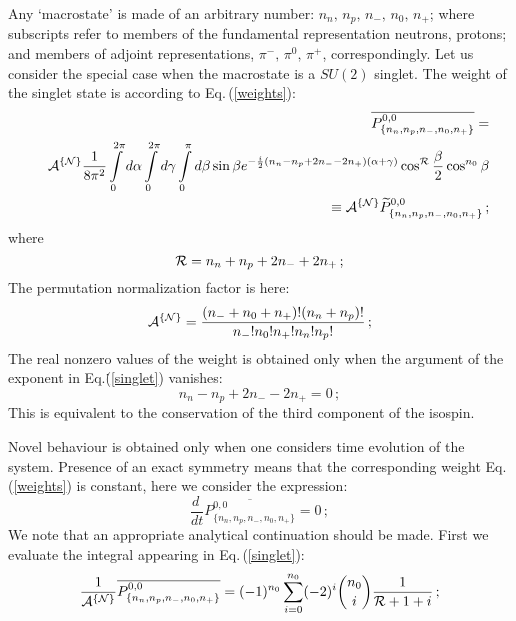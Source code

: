 \documentclass[a4paper,11pt]{article}
\begin{document}
Any  `macrostate' is made of an arbitrary number: $n_n,\, n_p,\,
n_{-},\, n_0, \, n_{+}$; where subscripts refer to members of the
fundamental representation  neutrons, protons; and members of
adjoint representations, $\pi^{-},\, \pi^0,\, \pi^{+}$,
 correspondingly.
Let us consider the special
 case when the macrostate is a $SU(2)$ singlet.
The weight of the singlet state is according to
Eq.\,(\ref{weights}):
\begin{eqnarray} \label{singlet}
& &\overline{P^{0,0}_{\{n_n,n_p,n_{-},n_0,n_{+}\}}}= \nonumber\\
&\ &{\cal A}^{\{{\cal N}\}}{1\over{8\pi^2}}
\int\limits^{2\pi}_0d\alpha\int\limits^{2\pi}_0d\gamma
\int\limits^{\pi}_0d\beta\sin\beta e^{-{i\over
2}(n_n-n_p+2n_{-}-2n_{+})(\alpha+\gamma)} \cos^{\cal R}{\beta\over
2}\cos^{n_0}\beta\nonumber\\ &&\qquad\qquad\qquad\qquad\equiv
{\cal A}^{\{{\cal N}\}}\widetilde
P^{0,0}_{\{n_n,n_p,n_{-},n_0,n_{+}\}}\,;
\end{eqnarray}
where
\begin{equation}\label{defR}
{\cal R}=n_n+n_p+2n_{-}+2n_{+}\,;
\end{equation}
The permutation normalization factor is here:
\begin{equation}\label{pifactor}
{\cal A}^{\{{\cal N}\}} =
\frac{(n_{-}+n_0+n_{+})!(n_n+n_p)!}{n_{-}!n_0!n_{+}!n_n!n_p!}\,;
\end{equation}
The real nonzero values of the weight is obtained only when the
argument of the exponent in  Eq.\.(\ref{singlet}) vanishes:
\begin{equation}\label{cond1}
n_n-n_p+2n_{-}-2n_{+}=0\,;
\end{equation}
This is equivalent to the conservation of the third component of
the isospin.

Novel behaviour is obtained only when one considers time evolution
of the system. Presence of an exact symmetry means that the
corresponding weight Eq.\,(\ref{weights}) is constant,  here we
consider the expression:
\begin{equation}\label{cond2}
\frac{d\ }{dt}\overline{P^{0,0}_{\{n_n,n_p,n_{-},n_0,n_{+}\}}}
 =0\,;
\end{equation}
We note that an appropriate analytical continuation should be
made. First we evaluate the integral appearing in
Eq.\,(\ref{singlet}):
\begin{equation}\label{singldiscr}
\frac{1}{{\cal A}^{\{{\cal
N}\}}}\overline{P^{0,0}_{\{n_n,n_p,n_{-},n_0,n_{+}\}}}=
(-1)^{n_0}\sum_{i=0}^{n_0}(-2)^i{n_0\choose i}\frac{1}{{\cal
R}+1+i}\,;
\end{equation}
\end{document}
